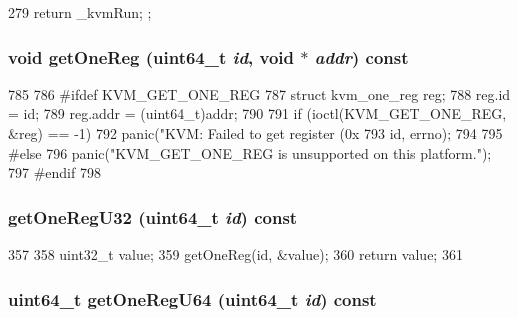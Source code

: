\begin{DoxyCode}
279 { return _kvmRun; };
\end{DoxyCode}
\hypertarget{classBaseKvmCPU_ab5a47c64ebf5a4de2539c6f71f7acc51}{
\subsubsection[{getOneReg}]{\setlength{\rightskip}{0pt plus 5cm}void getOneReg (uint64\_\-t {\em id}, \/  void $\ast$ {\em addr}) const}}
\label{classBaseKvmCPU_ab5a47c64ebf5a4de2539c6f71f7acc51}



\begin{DoxyCode}
785 {
786 #ifdef KVM_GET_ONE_REG
787     struct kvm_one_reg reg;
788     reg.id = id;
789     reg.addr = (uint64_t)addr;
790 
791     if (ioctl(KVM_GET_ONE_REG, &reg) == -1) {
792         panic("KVM: Failed to get register (0x%
793               id, errno);
794     }
795 #else
796     panic("KVM_GET_ONE_REG is unsupported on this platform.\n");
797 #endif
798 }
\end{DoxyCode}
\hypertarget{classBaseKvmCPU_abb51d3ccd07e153be4d5982c324a95bc}{
\subsubsection[{getOneRegU32}]{ getOneRegU32 (uint64\_\-t {\em id}) const}}
\label{classBaseKvmCPU_abb51d3ccd07e153be4d5982c324a95bc}



\begin{DoxyCode}
357                                              {
358         uint32_t value;
359         getOneReg(id, &value);
360         return value;
361     }
\end{DoxyCode}
\hypertarget{classBaseKvmCPU_a803c633f6b9fc380a376a5a6d2ca17ee}{
\subsubsection[{getOneRegU64}]{\setlength{\rightskip}{0pt plus 5cm}uint64\_\-t getOneRegU64 (uint64\_\-t {\em id}) const}}
\label{classBaseKvmCPU_a803c633f6b9fc380a376a5a6d2ca17ee}



